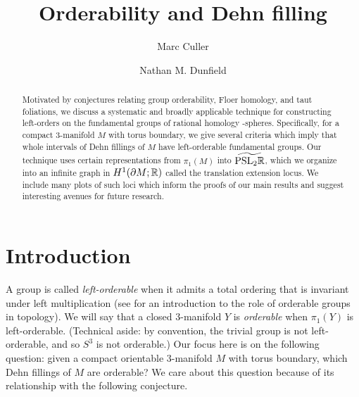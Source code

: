 \documentclass[tikz, sepfignums, defaultenums]{nmd/article}
\title{Orderability and Dehn filling}
\author{Marc Culler}
\author{Nathan M. Dunfield}
\begin{document}
\begin{abstract} 
  Motivated by conjectures relating group orderability, Floer
  homology, and taut foliations, we discuss a systematic and broadly
  applicable technique for constructing left-orders on the fundamental
  groups of rational homology \3-spheres.  Specifically, for a compact
  3-manifold $M$ with torus boundary, we give several criteria which
  imply that whole intervals of Dehn fillings of $M$ have
  left-orderable fundamental groups.  Our technique uses certain
  representations from $\pi_1(M)$ into $\widetilde{\mathrm{PSL}_{2} {\mathbb R}}$, which we organize
  into an infinite graph in $H^1(\partial M; {\mathbb R})$ called the
  translation extension locus.  We include many plots of such loci
  which inform the proofs of our main results and suggest interesting
  avenues for future research.
\end{abstract}
\maketitle

\setcounter{tocdepth}{1}
\tableofcontents
\pagebreak 

\section{Introduction}

A group is called \emph{left-orderable} when it admits a total ordering
that is invariant under left multiplication (see
\cite{ClayRolfsen2015} for an introduction to the role of orderable groups
in topology).  We will say that a closed $3$-manifold $Y$ is
\emph{orderable} when $\pi_1(Y)$ is left-orderable.  (Technical aside:
by convention, the trivial group is not left-orderable, and so $S^3$
is not orderable.)  Our focus here is on the following question: given
a compact orientable $3$-manifold $M$ with torus boundary, which Dehn
fillings of $M$ are orderable?  We care about this question because of
its relationship with the following conjecture.
\end{document}

